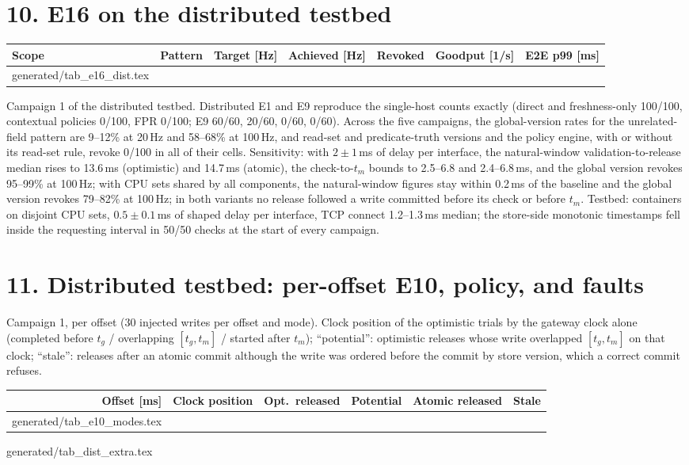 \documentclass[11pt]{article}
\makeatletter
\newcommand{\gen}[1]{\@@input generated/#1.tex }
\makeatother
\begin{document}
\section*{10. E16 on the distributed testbed}
\begin{center}\small
\footnotesize\setlength{\tabcolsep}{3.5pt}
\begin{tabular}{@{}llrrcrr@{}}
\toprule
\textbf{Scope} & \textbf{Pattern} & \textbf{Target [Hz]} & \textbf{Achieved [Hz]} & \textbf{Revoked} & \textbf{Goodput [1/s]} & \textbf{E2E p99 [ms]} \\
\midrule
\gen{tab_e16_dist}
\bottomrule
\end{tabular}
\end{center}
\noindent Campaign 1 of the distributed testbed. Distributed E1 and E9 reproduce the single-host counts exactly (direct and freshness-only 100/100, contextual policies 0/100, FPR 0/100; E9 60/60, 20/60, 0/60, 0/60). Across the five campaigns, the global-version rates for the unrelated-field pattern are 9--12\% at 20\,Hz and 58--68\% at 100\,Hz, and read-set and predicate-truth versions and the policy engine, with or without its read-set rule, revoke 0/100 in all of their cells. Sensitivity: with $2\pm1$\,ms of delay per interface, the natural-window validation-to-release median rises to 13.6\,ms (optimistic) and 14.7\,ms (atomic), the check-to-$t_m$ bounds to 2.5--6.8 and 2.4--6.8\,ms, and the global version revokes 95--99\% at 100\,Hz; with CPU sets shared by all components, the natural-window figures stay within 0.2\,ms of the baseline and the global version revokes 79--82\% at 100\,Hz; in both variants no release followed a write committed before its check or before $t_m$. Testbed: containers on disjoint CPU sets, $0.5\pm0.1$\,ms of shaped delay per interface, TCP connect 1.2--1.3\,ms median; the store-side monotonic timestamps fell inside the requesting interval in 50/50 checks at the start of every campaign.

\section*{11. Distributed testbed: per-offset E10, policy, and faults}
Campaign 1, per offset (30 injected writes per offset and mode). Clock position of the optimistic trials by the gateway clock alone (completed before $t_g$ / overlapping $[t_g,t_m]$ / started after $t_m$); ``potential'': optimistic releases whose write overlapped $[t_g,t_m]$ on that clock; ``stale'': releases after an atomic commit although the write was ordered before the commit by store version, which a correct commit refuses.
\begin{center}\small
\begin{tabular}{@{}rccccc@{}}
\toprule
\textbf{Offset [ms]} & \textbf{Clock position} & \textbf{Opt.\ released} & \textbf{Potential} & \textbf{Atomic released} & \textbf{Stale} \\
\midrule
\gen{tab_e10_modes}
\bottomrule
\end{tabular}
\end{center}
\gen{tab_dist_extra}
\end{document}
